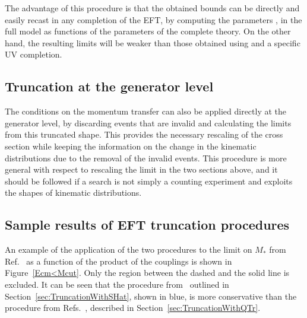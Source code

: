 The advantage of this procedure is that the obtained bounds can be directly and easily recast in any  completion of the EFT, by computing the parameters \Mstar, \Mcut in the full model as functions of the parameters of the complete theory. On the other hand, the resulting limits will be weaker than those obtained using \Qtr and a specific UV completion.

\subsection{Truncation at the generator level}

The conditions on the momentum transfer can also be applied directly at the generator level, by discarding 
events that are invalid and calculating the limits from this truncated shape. 
This provides the necessary rescaling of the cross section while keeping the information on the change in the kinematic distributions due to the removal of the invalid events. This procedure is more general with 
respect to rescaling the limit in the two sections above, and it should be followed if
a search is not simply a counting experiment and exploits the shapes of kinematic distributions.

\subsection{Sample results of EFT truncation procedures}

An example of the application of the two procedures to the limit on $M_*$ from Ref.~\cite{ATL-PHYS-PUB-2014-007} as a function of the product of the couplings is shown in Figure~\ref{Ecm<Mcut}. Only the region between the dashed and the solid line is excluded. It can be seen that the procedure from~\cite{Racco:2015dxa} outlined in Section~\ref{sec:TruncationWithSHat}, shown in blue, is more conservative than the procedure from Refs.~\cite{Busoni:2014sya,Aad:2015zva}, described in Section~\ref{sec:TruncationWithQTr}.


